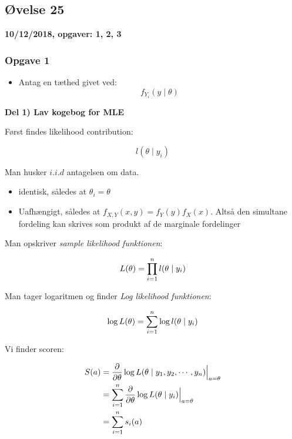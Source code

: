 \horizline

\subsection{Øvelse 25}

\textbf{10/12/2018, opgaver: 1, 2, 3}

\subsubsection{Opgave 1}

\begin{itemize}
    \item Antag en tæthed givet ved:
        \begin{equation}
            f_{Y_i}(y \mid \theta)
        \end{equation}
\end{itemize}

\textbf{Del 1) Lav kogebog for MLE}

Først findes likelihood contribution:

\begin{equation}
    l(\theta \mid y_i)
\end{equation}

Man husker $i.i.d$ antagelsen om data.

\begin{itemize}
    \item identisk, således at $\theta_i = \theta$
    \item Uafhængigt, således at $f_{X , Y}(x,y) = f_Y(y) f_X(x)$. Altså den simultane fordeling kan skrives som produkt af de marginale fordelinger
\end{itemize}

Man opskriver \textit{sample likelihood funktionen}:

\begin{equation}
    L (\theta) = \prod_{i=1}^{n} l(\theta \mid y_i)
\end{equation}

Man tager logaritmen og finder \textit{Log likelihood funktionen}:

\begin{equation}
    \log L (\theta) = \sum_{i=1}^{n} \log l(\theta \mid y_i)
\end{equation}

Vi finder scoren:

\begin{align}
    S(a) &= \frac{\partial}{\partial \theta} \log L(\theta \mid y_1, y_2, \cdots, y_n) \Big\vert_{a= \theta} \\
    &= \sum_{i=1}^{n} \frac{\partial}{\partial \theta} \log L(\theta \mid y_i) \Big\vert_{a= \theta} \\
    &= \sum_{i=1}^{n} s_i (a)
\end{align}

